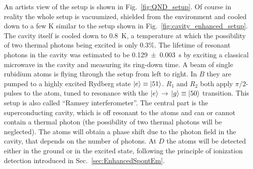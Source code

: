An artists view of the setup is shown in Fig.~\ref{fig:QND_setup}. Of course in
reality the whole setup is vacuumized, shielded from the environment and cooled
down to a few \si{K} similar to the setup shown in
Fig.~\ref{fig:cavity_enhanced_setup}. The cavity itself is cooled down to
\SI{0.8}{K}, a temperature at which the possibility of two thermal photons being
excited is only 0.3\%. The lifetime of resonant photons in the
cavity was estimated to be \SI{0.129\pm0.003}{s} by exciting a classical microwave in the cavity and
measuring its ring-down time. A beam of single rubidium atoms is flying through
the setup from left to right. In $B$ they are pumped to a highly excited Rydberg
state $\ket{e} \equiv \ket{51}$. $R_1$ and $R_2$ both apply $\pi/2$-pulses to
the atom, tuned to resonance with the
$\ket{e}\,\rightarrow\,\ket{g}\equiv\ket{50}$ transition. This setup is also
called ``Ramsey interferometer''. The central part is the superconducting
cavity, which is off resonant to the atoms and can or cannot contain a thermal
photon (the possibility of two thermal photons will be neglected). The atoms
will obtain a phase shift due to the photon field in the cavity, that depends on
the number of photons. At $D$ the atoms will be detected either in the ground or
in the excited state, following the principle of ionization detection introduced
in Sec.~\ref{sec:EnhancedSpontEm}.

